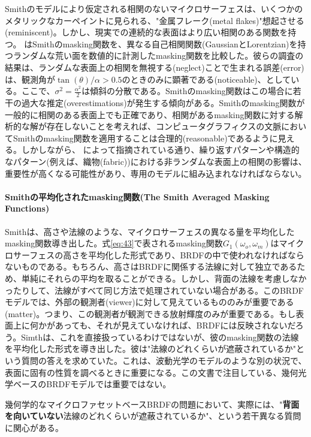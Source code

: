 \documentclass[a4j,xelatex,ja=standard]{bxjsarticle}
\begin{document}
Smithのモデルにより仮定される相関のないマイクロサーフェスは、いくつかのメタリックなカーペイントに見られる、"金属フレーク(metal flakes)"想起させる(reminiscent)\cite{Rump2008}。しかし、現実での連続的な表面はより広い相関のある関数を持つ。\citeauthor{Bourlier2000} \cite{Bourlier2000}はSmithのmasking関数を、異なる自己相関関数(GaussianとLorentzian)を持つランダムな荒い面を数値的に計測したmasking関数を比較した。彼らの調査の結果は、ランダムな表面上の相関を無視する(neglect)ことで生まれる誤差(error)は、観測角が$\tan(\theta) / \alpha > 0.5$のときのみに顕著である(noticeable)、としている。ここで、$\sigma^2 = \frac{\alpha^2}{2}$は傾斜の分散である。Smithのmasking関数はこの場合に若干の過大な推定(overestimations)が発生する傾向がある。Smithのmasking関数が一般的に相関のある表面上でも正確であり、相関があるmasking関数に対する解析的な解が存在しないことを考えれば、コンピュータグラフィクスの文脈においてSmithのmasking関数を適用することは合理的(reasonable)であるように見える。しかしながら、\citeauthor{Ashikmin2000} \cite{Ashikmin2000}によって指摘されている通り、繰り返すパターンや構造的なパターン(例えば、織物(fabric))における非ランダムな表面上の相関の影響は、重要性が高くなる可能性があり、専用のモデルに組み込まれなければならない。

\paragraph{Smithの平均化されたmasking関数(The Smith Averaged Masking Functions)}

Smithは、高さや法線のような、マイクロサーフェスの異なる量を平均化したmasking関数導き出した\cite{Smith1967}。式\eqref{eq:43}で表されるmasking関数$G_1(\omega_o, \omega_m)$はマイクロサーフェスの高さを平均化した形式であり、BRDFの中で使われなければならないものである。もちろん、高さはBRDFに関係する法線に対して独立であるため、単純にそれらの平均を取ることができる。しかし、背面の法線を考慮しなかったりして、法線がすべて同じ方法で処理されていない場合がある。このBRDFモデルでは、外部の観測者(viewer)に対して見えているもののみが重要である(matter)。つまり、この観測者が観測できる放射輝度のみが重要である。もし表面上に何かがあっても、それが見えていなければ、BRDFには反映されないだろう。Simthは、これを直接扱っているわけではないが、彼のmasking関数の法線を平均化した形式を導き出した。彼は"法線のどれくらいが遮蔽されているか"という質問の答えを求めていた。これは、波動光学のモデルのような別の状況で、表面に固有の性質を調べるときに重要になる。この文書で注目している、幾何光学ベースのBRDFモデルでは重要ではない。

幾何学的なマイクロファセットベースBRDFの問題において、実際には、"\textbf{背面を向いていない}法線のどれくらいが遮蔽されているか"、という若干異なる質問に関心がある。
\end{document}
